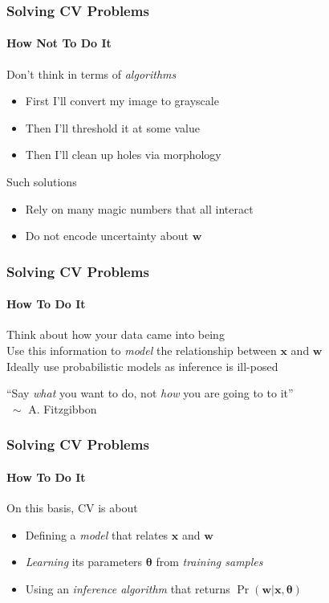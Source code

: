 \documentclass[xetex,professionalfont]{beamer}
\renewcommand{\vec}[1]{\ensuremath{\mathbf{#1}}}
\newcommand{\vw}{\vec{w}}
\newcommand{\vx}{\vec{x}}
\newcommand{\bth}{\boldsymbol{\theta}}
\begin{document}
\begin{frame}
\frametitle{Solving CV Problems}
\framesubtitle{How Not To Do It}

Don't think in terms of \emph{algorithms}
\begin{itemize}
    \item First I'll convert my image to grayscale
    \item Then I'll threshold it at some value
    \item Then I'll clean up holes via morphology 
\end{itemize}

\bigskip
Such solutions
\begin{itemize}
    \item Rely on many magic numbers that all interact %
    \item Do not encode uncertainty about $\vw$ %
\end{itemize}

\end{frame}


\begin{frame}
\frametitle{Solving CV Problems}
\framesubtitle{How To Do It}

Think about how your data came into being \\\medskip
Use this information to \emph{model} the relationship between $\vx$ and $\vw$ \\\medskip
Ideally use probabilistic models as inference is ill-posed %

\bigskip\bigskip
\enquote{Say \emph{what} you want to do, not \emph{how} you are going to to it}\\ $\;\sim$ A. Fitzgibbon

\end{frame}


\begin{frame}
\frametitle{Solving CV Problems}
\framesubtitle{How To Do It}

On this basis, CV is about
\begin{itemize}
    \item Defining a \emph{model} that relates $\vx$ and $\vw$
    \item \emph{Learning} its parameters $\bth$ from \emph{training samples} 
    \item Using an \emph{inference algorithm} that returns $\Pr(\vw|\vx,\bth)$ %
\end{itemize}

\end{frame}
\end{document}
